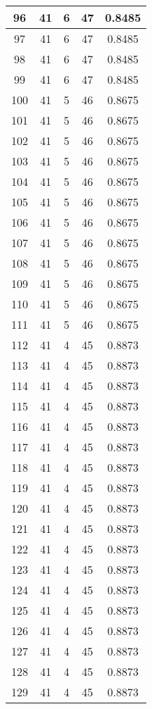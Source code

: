 \documentclass[letterpaper, 12pt]{article}
\begin{document}
\begin{longtable}{|c|c|c|c|c|}
\hline
96 & 41 & 6 & 47 & 0.8485 \\
\hline
97 & 41 & 6 & 47 & 0.8485 \\
\hline
98 & 41 & 6 & 47 & 0.8485 \\
\hline
99 & 41 & 6 & 47 & 0.8485 \\
\hline
100 & 41 & 5 & 46 & 0.8675 \\
\hline
101 & 41 & 5 & 46 & 0.8675 \\
\hline
102 & 41 & 5 & 46 & 0.8675 \\
\hline
103 & 41 & 5 & 46 & 0.8675 \\
\hline
104 & 41 & 5 & 46 & 0.8675 \\
\hline
105 & 41 & 5 & 46 & 0.8675 \\
\hline
106 & 41 & 5 & 46 & 0.8675 \\
\hline
107 & 41 & 5 & 46 & 0.8675 \\
\hline
108 & 41 & 5 & 46 & 0.8675 \\
\hline
109 & 41 & 5 & 46 & 0.8675 \\
\hline
110 & 41 & 5 & 46 & 0.8675 \\
\hline
111 & 41 & 5 & 46 & 0.8675 \\
\hline
112 & 41 & 4 & 45 & 0.8873 \\
\hline
113 & 41 & 4 & 45 & 0.8873 \\
\hline
114 & 41 & 4 & 45 & 0.8873 \\
\hline
115 & 41 & 4 & 45 & 0.8873 \\
\hline
116 & 41 & 4 & 45 & 0.8873 \\
\hline
117 & 41 & 4 & 45 & 0.8873 \\
\hline
118 & 41 & 4 & 45 & 0.8873 \\
\hline
119 & 41 & 4 & 45 & 0.8873 \\
\hline
120 & 41 & 4 & 45 & 0.8873 \\
\hline
121 & 41 & 4 & 45 & 0.8873 \\
\hline
122 & 41 & 4 & 45 & 0.8873 \\
\hline
123 & 41 & 4 & 45 & 0.8873 \\
\hline
124 & 41 & 4 & 45 & 0.8873 \\
\hline
125 & 41 & 4 & 45 & 0.8873 \\
\hline
126 & 41 & 4 & 45 & 0.8873 \\
\hline
127 & 41 & 4 & 45 & 0.8873 \\
\hline
128 & 41 & 4 & 45 & 0.8873 \\
\hline
129 & 41 & 4 & 45 & 0.8873 \\

\end{longtable}
\end{document}
